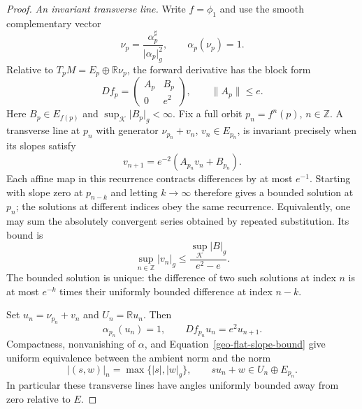 \begin{proof}
\emph{An invariant transverse line.}
Write $f=\phi_1$ and use the smooth complementary vector
\[
 \nu_p=\frac{\alpha_p^\sharp}{\lvert\alpha_p\rvert_g^2},
 \qquad \alpha_p(\nu_p)=1.
\]
Relative to $T_pM=E_p\oplus\mathbb R\nu_p$, the forward derivative
has the block form
\begin{equation}
\label{geo-flat-forward-blocks}
 Df_p=
 \begin{pmatrix} A_p&B_p\\0&e^2\end{pmatrix},
 \qquad \lVert A_p\rVert\leq e.
\end{equation}
Here $B_p\in E_{f(p)}$ and $\sup_{\mathcal K}\lvert B_p\rvert_g<\infty$.
Fix a full orbit $p_n=f^n(p)$, $n\in\mathbb Z$.  A transverse line at
$p_n$ with generator $\nu_{p_n}+v_n$, $v_n\in E_{p_n}$, is invariant
precisely when its slopes satisfy
\begin{equation}
\label{geo-flat-slope-recurrence}
 v_{n+1}=e^{-2}(A_{p_n}v_n+B_{p_n}).
\end{equation}
Each affine map in this recurrence contracts differences by at most
$e^{-1}$.  Starting with slope zero at $p_{n-k}$ and letting
$k\to\infty$ therefore gives a bounded solution at $p_n$; the solutions
at different indices obey the same recurrence.  Equivalently, one may
sum the absolutely convergent series obtained by repeated substitution.
Its bound is
\begin{equation}
\label{geo-flat-slope-bound}
 \sup_{n\in\mathbb Z}\lvert v_n\rvert_g
 \leq\frac{\sup_{\mathcal K}\lvert B\rvert_g}{e^2-e}.
\end{equation}
The bounded solution is unique: the difference of two such solutions at
index $n$ is at most $e^{-k}$ times their uniformly bounded difference
at index $n-k$.

Set $u_n=\nu_{p_n}+v_n$ and $U_n=\mathbb R u_n$.  Then
\[
 \alpha_{p_n}(u_n)=1,\qquad Df_{p_n}u_n=e^2u_{n+1}.
\]
Compactness, nonvanishing of $\alpha$, and
Equation~\eqref{geo-flat-slope-bound} give uniform equivalence between
the ambient norm and the norm
\[
 \lvert(s,w)\rvert_n=\max\{\lvert s\rvert,\lvert w\rvert_g\},
 \qquad su_n+w\in U_n\oplus E_{p_n}.
\]
In particular these transverse lines have angles uniformly bounded away
from zero relative to $E$.


\end{proof}
